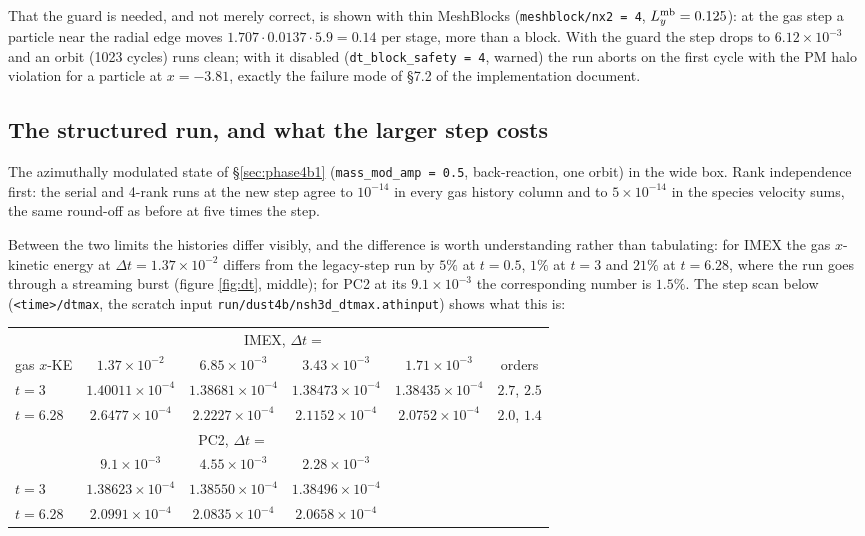 \documentclass[11pt]{article}
\newcommand{\code}[1]{\texttt{#1}}
\newcommand{\file}[1]{\texttt{#1}}
\begin{document}
That the guard is needed, and not merely correct, is shown with thin MeshBlocks
(\code{meshblock/nx2 = 4}, $L^{\rm mb}_y = 0.125$): at the gas step a particle near the
radial edge moves $1.707 \cdot 0.0137 \cdot 5.9 = 0.14$ per stage, more than a block.
With the guard the step drops to $6.12\times10^{-3}$ and an orbit (1023 cycles) runs
clean; with it disabled (\code{dt\_block\_safety = 4}, warned) the run aborts on the
first cycle with the PM halo violation for a particle at $x = -3.81$, exactly the
failure mode of \S7.2 of the implementation document.

\subsection{The structured run, and what the larger step costs}

The azimuthally modulated state of \S\ref{sec:phase4b1} (\code{mass\_mod\_amp = 0.5},
back-reaction, one orbit) in the wide box. Rank independence first: the serial and
4-rank runs at the new step agree to $10^{-14}$ in every gas history column and to
$5\times10^{-14}$ in the species velocity sums, the same round-off as before at five
times the step.

Between the two limits the histories differ visibly, and the difference is worth
understanding rather than tabulating: for IMEX the gas $x$-kinetic energy at
$\Delta t = 1.37\times10^{-2}$ differs from the legacy-step run by $5\%$ at $t = 0.5$,
$1\%$ at $t = 3$ and $21\%$ at $t = 6.28$, where the run goes through a streaming
burst (figure \ref{fig:dt}, middle); for PC2 at its $9.1\times10^{-3}$ the
corresponding number is $1.5\%$. The step scan below (\code{<time>/dtmax}, the
scratch input \file{run/dust4b/nsh3d\_dtmax.athinput}) shows what this is:

\begin{center}
\small
\begin{tabular}{@{}lccccc@{}}
\toprule
 & \multicolumn{4}{c}{IMEX, $\Delta t =$} & \\
gas $x$-KE & $1.37\times10^{-2}$ & $6.85\times10^{-3}$ & $3.43\times10^{-3}$ & $1.71\times10^{-3}$ & orders \\
\midrule
$t = 3$ & $1.40011\times10^{-4}$ & $1.38681\times10^{-4}$ & $1.38473\times10^{-4}$ & $1.38435\times10^{-4}$ & $2.7$, $2.5$ \\
$t = 6.28$ & $2.6477\times10^{-4}$ & $2.2227\times10^{-4}$ & $2.1152\times10^{-4}$ & $2.0752\times10^{-4}$ & $2.0$, $1.4$ \\
\midrule
 & \multicolumn{3}{c}{PC2, $\Delta t =$} & & \\
 & $9.1\times10^{-3}$ & $4.55\times10^{-3}$ & $2.28\times10^{-3}$ & & \\
\midrule
$t = 3$ & $1.38623\times10^{-4}$ & $1.38550\times10^{-4}$ & $1.38496\times10^{-4}$ & & \\
$t = 6.28$ & $2.0991\times10^{-4}$ & $2.0835\times10^{-4}$ & $2.0658\times10^{-4}$ & & \\
\bottomrule
\end{tabular}
\end{center}
\end{document}
